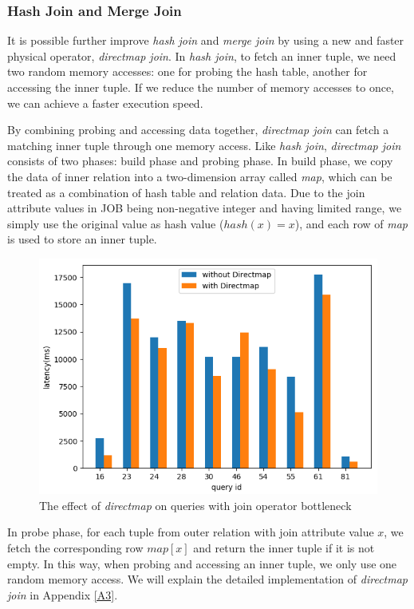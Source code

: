     \subsubsection{Hash Join and Merge Join}
        It is possible further improve \textit{hash join} and \textit{merge join} by using a new and faster physical operator, \textit{directmap join}. In \textit{hash join}, to fetch an inner tuple, we need two random memory accesses: one for probing the hash table, another for accessing the inner tuple. If we reduce the number of memory accesses to once, we can achieve a faster execution speed.\par
        By combining probing and accessing data together, \textit{directmap join} can fetch a matching inner tuple through one memory access. Like \textit{hash join}, \textit{directmap join} consists of two phases: build phase and probing phase. In build phase, we copy the data of inner relation into a two-dimension array called \textit{map}, which can be treated as a combination of hash table and relation data. Due to the join attribute values in JOB being non-negative integer and having limited range, we simply use the original value as hash value ($hash(x)=x$), and each row of \textit{map} is used to store an inner tuple.
        \begin{figure}[htb]
            \includegraphics[width=\linewidth]{./pic/Figure17.png}
            \caption{The effect of \textit{directmap} on queries with join operator bottleneck}
            \label{F17}
            \Description{}
        \end{figure}\par
        In probe phase, for each tuple from outer relation with join attribute value $x$, we fetch the corresponding row $\textit{map}[x]$ and return the inner tuple if it is not empty. In this way, when probing and accessing an inner tuple, we only use one random memory access. We will explain the detailed implementation of \textit{directmap join} in Appendix \ref{A3}.\par
